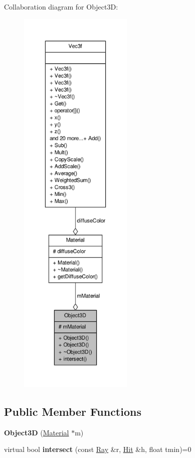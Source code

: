\-Collaboration diagram for \-Object3\-D\-:
\nopagebreak
\begin{figure}[H]
\begin{center}
\leavevmode
\includegraphics[height=550pt]{classObject3D__coll__graph}
\end{center}
\end{figure}
\subsection*{\-Public \-Member \-Functions}
\begin{DoxyCompactItemize}
\item 
\hypertarget{classObject3D_ae29d1ad924cb8ab4b1b5c5647622f390}{{\bfseries \-Object3\-D} (\hyperlink{classMaterial}{\-Material} $\ast$m)}\label{classObject3D_ae29d1ad924cb8ab4b1b5c5647622f390}

\item 
\hypertarget{classObject3D_a58f07cf2b37c5b6a1c796cd7a939f91b}{virtual bool {\bfseries intersect} (const \hyperlink{classRay}{\-Ray} \&r, \hyperlink{classHit}{\-Hit} \&h, float tmin)=0}\label{classObject3D_a58f07cf2b37c5b6a1c796cd7a939f91b}

\end{DoxyCompactItemize}
